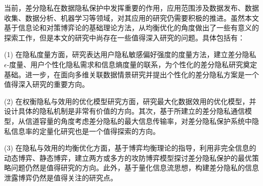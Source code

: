 当前，差分隐私在数据隐私保护中发挥重要的作用，应用范围涉及数据发布、数据收集、数据分析、机器学习等领域，对其应用的研究仍需要积极的推进。虽然本文基于信息论和对策博弈论的基础理论方法，从均衡优化的角度做出了一些有意义的探索工作，但是本文的研究中尚存在一些值得深入研究的问题。具体包括有：

(1) 在隐私度量方面，研究表达用户隐私敏感偏好强度的度量方法，建立差分隐私$\epsilon$-度量、用户个性化隐私需求和信息熵度量的联系，为个性化的差分隐私研究奠定基础。进一步，在面向多维关联数据情景研究并提出个性化的差分隐私方案是一个值得深入研究的重要方向。

(2) 在权衡隐私与效用的优化模型研究方面，研究最大化数据效用的优化模型，并设计具体的隐私机制是非常有价值的方向。其次，基于所建立的差分隐私通信模型，从信道容量的角度考虑差分隐私的最大信息传输率，对差分隐私保护系统中隐私信息率的定量化研究也是一个值得探索的方向。


(3) 在隐私与效用的均衡优化方面，基于博弈均衡理论的指导，利用非完全信息的动态博弈、静态博弈，建立两方或多方的攻防博弈模型探讨差分隐私保护的最优策略问题仍然是值得研究的方向。此外，基于量化信息流思想，构建差分隐私的信息泄露博弈仍然是值得关注的研究点。



